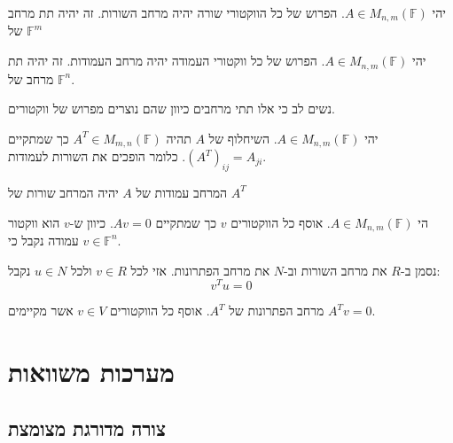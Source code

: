 \documentclass{tstextbook}
\begin{document}
\begin{definition}
יהי \(A \in M_{n,m}\left( \mathbb{F}  \right)\). הפרוש של כל הווקטורי שורה יהיה מרחב השורות. זה יהיה תת מרחב של \(\mathbb{F} ^{m}\)

\end{definition}
\begin{definition}
יהי \(A \in M_{n,m}\left( \mathbb{F}  \right)\). הפרוש של כל ווקטורי העמודה יהיה מרחב העמודות. זה יהיה תת מרחב של \(\mathbb{F} ^{n}\).

\end{definition}
\begin{remark}
נשים לב כי אלו תתי מרחבים כיוון שהם נוצרים מפרוש של ווקטורים. 

\end{remark}
\begin{definition}
יהי \(A \in M_{n,m}\left( \mathbb{F}  \right)\). השיחלוף של \(A\) תהיה \(A^{T}\in M_{m,n}\left( \mathbb{F}  \right)\) כך שמתקיים \((A^{T})_{ij}=A_{ji}\). כלומר הופכים את השורות לעמודות.

\end{definition}
\begin{proposition}
המרחב עמודות של \(A\) יהיה המרחב שורות של \(A^{T}\)

\end{proposition}
\begin{definition}
הי \(A \in M_{n,m}\left( \mathbb{F}  \right)\). אוסף כל הווקטורים \(v\) כך שמתקיים \(Av=0\). כיוון ש-\(v\) הוא ווקטור עמודה נקבל כי \(v\in \mathbb{F} ^{n}\).

\end{definition}
\begin{proposition}
נסמן ב-\(R\) את מרחב השורות וב-\(N\) את מרחב הפתרונות. אזי לכל \(v \in R\) ולכל \(u \in N\) נקבל:
$$v^{T}u=0$$

\end{proposition}
\begin{definition}
מרחב הפתרונות של \(A^{T}\). אוסף כל הווקטורים \(v \in V\) אשר מקיימים \(A^{T}v=0\).

\end{definition}
\section{מערכות משוואות}

\subsection{צורה מדורגת מצומצת}
\end{document}
